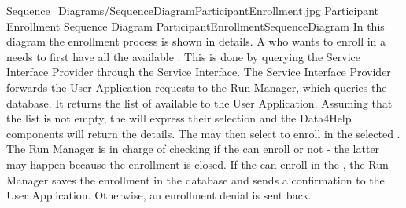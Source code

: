 \documentclass[../../DD.tex]{subfiles}
\begin{document}
	\image {13cm} {Sequence_Diagrams/SequenceDiagramParticipantEnrollment.jpg} {Participant Enrollment Sequence Diagram} {ParticipantEnrollmentSequenceDiagram}
	In this diagram the  enrollment process is shown in details. A  who wants to enroll in a  needs to first have all the available . This is done by querying the Service Interface Provider through the Service Interface. The Service Interface Provider forwards the User Application requests to the Run Manager, which queries the database. It returns the list of available  to the User Application. Assuming that the list is not empty, the  will express their selection and the Data4Help components will return the  details. The  may then select to enroll in the selected . The Run Manager is in charge of checking if the  can enroll or not - the latter may happen because the enrollment is closed. If the  can enroll in the , the Run Manager saves the enrollment in the database and sends a confirmation to the User Application. Otherwise, an enrollment denial is sent back.
\end{document}
